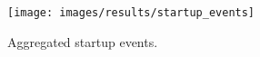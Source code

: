 
\begin{figure}[H]
	\centering
    \texttt{[image: images/results/startup\_events]}
    \caption{Aggregated startup events.}
    \label{fig:startup_events}
\end{figure}
